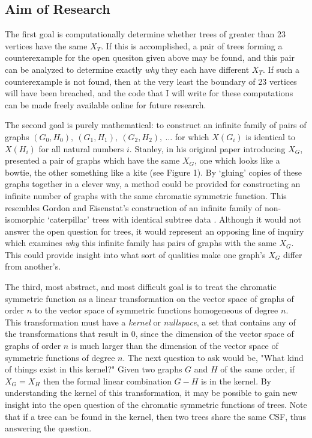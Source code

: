 \documentclass[a4paper,12pt]{article}
\begin{document}
\begin{spacing}{1}
\subsection*{Aim of Research}
The first goal is computationally determine whether trees of greater than 23 vertices have the same $X_T$. If this is accomplished, a pair of trees forming a counterexample for the open quesiton given above may be found, and this pair can be analyzed to determine exactly \emph{why} they each have different $X_T$. If such a counterexample is not found, then at the very least the boundary of 23 vertices will have been breached, and the code that I will write for these computations can be made freely available online for future research.

The second goal is purely mathematical: to construct an infinite family of pairs of graphs $(G_0, H_0),\ (G_1, H_1),\ (G_2, H_2),\ \ldots$ for which $X(G_i)$ is identical to $X(H_i)$ for all natural numbers $i$. Stanley, in his original paper introducing $X_G$, presented a pair of graphs which have the same $X_G$, one which looks like a bowtie, the other something like a kite (see Figure 1). By `gluing' copies of these graphs together in a clever way, a method could be provided for constructing an infinite number of graphs with the same chromatic symmetric function. This resembles Gordon and Eisenstat's construction of an infinite family of non-isomorphic `caterpillar' trees with identical subtree data \cite{caterpillarfamily}. Although it would not answer the open question for trees, it would represent an opposing line of inquiry which examines \emph{why} this infinite family has pairs of graphs with the same $X_G$. This could provide insight into what sort of qualities make one graph's $X_G$ differ from another's.

The third, most abstract, and most difficult goal is to treat the chromatic symmetric function as a linear transformation on the vector space of graphs of order $n$ to the vector space of symmetric functions homogeneous of degree $n$. This transformation must have a \emph{kernel} or \emph{nullspace}, a set that contains any of the transformations that result in $0$, since the dimension of the vector space of graphs of order $n$ is much larger than the dimension of the vector space of symmetric functions of degree $n$. The next question to ask would be, "What kind of things exist in this kernel?" Given two graphs $G$ and $H$ of the same order, if $X_G = X_H$ then the formal linear combination $G - H$ is in the kernel. By understanding the kernel of this transformation, it may be possible to gain new insight into the open question of the chromatic symmetric functions of trees. Note that if a tree can be found in the kernel, then two trees share the same CSF, thus answering the question.


\end{spacing}
\end{document}
